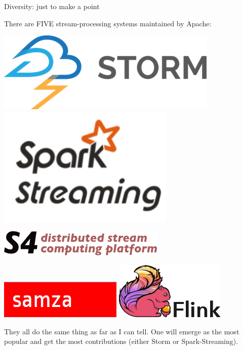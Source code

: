 \documentclass{beamer}
\begin{document}
\begin{frame}{Diversity: just to make a point}

There are FIVE stream-processing systems maintained by Apache:

\begin{center}
\begin{minipage}{0.8\linewidth}
\begin{center}
\includegraphics[width=0.4\linewidth]{streaming-1.png} \hfill
\includegraphics[width=0.4\linewidth]{streaming-2.png}

\vspace{0.2 cm}
\includegraphics[width=0.5\linewidth]{streaming-3.png}

\vspace{0.2 cm}
\includegraphics[width=0.4\linewidth]{streaming-4.png} \hfill
\includegraphics[width=0.4\linewidth]{streaming-5.jpg}
\end{center}
\end{minipage}
\end{center}

\vfill
They all do the same thing as far as I can tell. One will emerge as the most popular and get the most contributions (either Storm or Spark-Streaming).
\end{frame}
\end{document}
